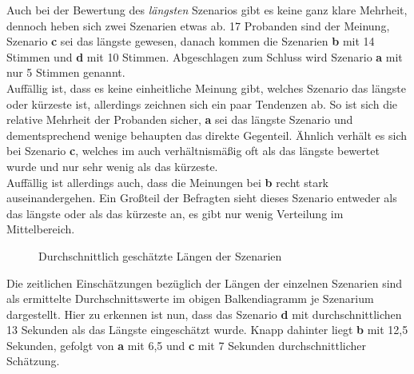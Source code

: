 \documentclass{Paper}
\begin{document}
Auch bei der Bewertung des \textit{längsten} Szenarios gibt es keine ganz klare Mehrheit, dennoch heben sich zwei Szenarien etwas ab. 17 Probanden sind der Meinung, Szenario \textbf{c} sei das längste gewesen, danach kommen die Szenarien \textbf{b} mit 14 Stimmen und \textbf{d} mit 10 Stimmen. Abgeschlagen zum Schluss wird Szenario \textbf{a} mit nur 5 Stimmen genannt.\\
Auffällig ist, dass es keine einheitliche Meinung gibt, welches Szenario das längste oder kürzeste ist, allerdings zeichnen sich ein paar Tendenzen ab. So ist sich die relative Mehrheit der Probanden sicher, \textbf{a} sei das längste Szenario und dementsprechend wenige behaupten das direkte Gegenteil. Ähnlich verhält es sich bei Szenario \textbf{c}, welches im auch verhältnismäßig oft als das längste bewertet wurde und nur sehr wenig als das kürzeste.\\
Auffällig ist allerdings auch, dass die Meinungen bei \textbf{b} recht stark auseinandergehen. Ein Großteil der Befragten sieht dieses Szenario entweder als das längste oder als das kürzeste an, es gibt nur wenig Verteilung im Mittelbereich.
	
	
	
\begin{figure}	[H]
\caption{Durchschnittlich geschätzte Längen der Szenarien}
\label{LaengeSzenarien}
\end{figure}
\par
Die zeitlichen Einschätzungen bezüglich der Längen der einzelnen Szenarien sind als ermittelte Durchschnittswerte im obigen Balkendiagramm je Szenarium dargestellt. Hier zu erkennen ist nun, dass das Szenario \textbf{d} mit durchschnittlichen 13 Sekunden als das Längste eingeschätzt wurde. Knapp dahinter liegt \textbf{b} mit 12,5 Sekunden, gefolgt von \textbf{a} mit 6,5 und \textbf{c} mit 7 Sekunden durchschnittlicher Schätzung.
\end{document}
